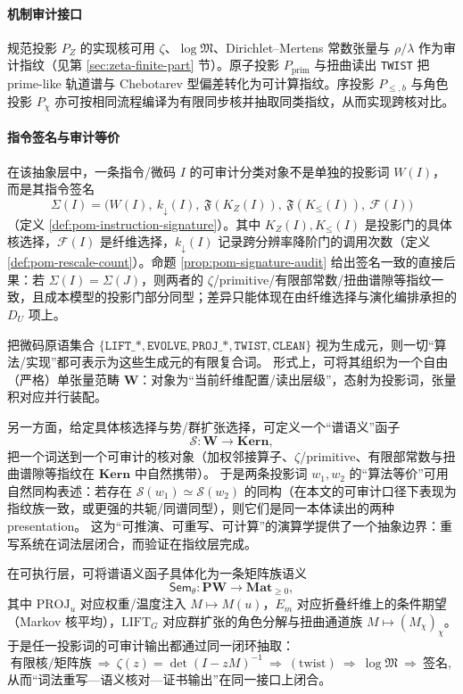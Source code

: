 \paragraph{机制审计接口}
规范投影 $P_Z$ 的实现核可用 $\zeta$、$\log\mathfrak{M}$、Dirichlet--Mertens 常数张量与 $\rho/\lambda$ 作为审计指纹（见第 \ref{sec:zeta-finite-part} 节）。原子投影 $P_{\mathrm{prim}}$ 与扭曲读出 \texttt{TWIST} 把 prime-like 轨道谱与 Chebotarev 型偏差转化为可计算指纹。序投影 $P_{\le,b}$ 与角色投影 $P_\chi$ 亦可按相同流程编译为有限同步核并抽取同类指纹，从而实现跨核对比。

\paragraph{指令签名与审计等价}
在该抽象层中，一条指令/微码 $I$ 的可审计分类对象不是单独的投影词 $W(I)$，而是其指令签名
$$
\Sigma(I)=\bigl(W(I),\ k_{\downarrow}(I),\ \mathfrak{F}(K_Z(I)),\ \mathfrak{F}(K_{\le}(I)),\ \mathcal{F}(I)\bigr)
$$
（定义 \ref{def:pom-instruction-signature}）。其中 $K_Z(I),K_{\le}(I)$ 是投影门的具体核选择，$\mathcal{F}(I)$ 是纤维选择，$k_{\downarrow}(I)$ 记录跨分辨率降阶门的调用次数（定义 \ref{def:pom-rescale-count}）。命题 \ref{prop:pom-signature-audit} 给出签名一致的直接后果：若 $\Sigma(I)=\Sigma(J)$，则两者的 $\zeta$/primitive/有限部常数/扭曲谱隙等指纹一致，且成本模型的投影门部分同型；差异只能体现在由纤维选择与演化编排承担的 $D_U$ 项上。

\begin{remark}[投影词范畴与“算法等价 = 自然同构”的口径]\label{rem:pom-word-category}
把微码原语集合
\(
\{\texttt{LIFT\_*},\texttt{EVOLVE},\texttt{PROJ\_*},\texttt{TWIST},\texttt{CLEAN}\}
\)
视为生成元，则一切“算法/实现”都可表示为这些生成元的有限复合词。
形式上，可将其组织为一个自由（严格）单张量范畴 \(\mathbf{W}\)：对象为“当前纤维配置/读出层级”，态射为投影词，张量积对应并行装配。

另一方面，给定具体核选择与势/群扩张选择，可定义一个“谱语义”函子
\[
\mathcal{S}:\mathbf{W}\to \mathbf{Kern},
\]
把一个词送到一个可审计的核对象（加权邻接算子、\(\zeta\)/primitive、有限部常数与扭曲谱隙等指纹在 \(\mathbf{Kern}\) 中自然携带）。
于是两条投影词 \(w_1,w_2\) 的“算法等价”可用自然同构表述：若存在 \(\mathcal{S}(w_1)\simeq \mathcal{S}(w_2)\) 的同构（在本文的可审计口径下表现为指纹族一致，或更强的共轭/同谱同型），则它们是同一本体读出的两种 presentation。
这为“可推演、可重写、可计算”的演算学提供了一个抽象边界：重写系统在词法层闭合，而验证在指纹层完成。
\end{remark}

\begin{remark}\label{rem:pom-sem-functor-loop}
在可执行层，可将谱语义函子具体化为一条矩阵族语义
\[
\mathsf{Sem}_\theta:\mathbf{PW}\to \mathbf{Mat}_{\ge 0},
\]
其中 \(\mathrm{PROJ}_u\) 对应权重/温度注入 \(M\mapsto M(u)\)，\(E_m\) 对应折叠纤维上的条件期望（Markov 核平均），\(\mathrm{LIFT}_G\) 对应群扩张的角色分解与扭曲通道族 \(M\mapsto (M_\chi)_\chi\)。
于是任一投影词的可审计输出都通过同一闭环抽取：
\[
\text{有限核/矩阵族}\ \Rightarrow\ \zeta(z)=\det(I-zM)^{-1}\ \Rightarrow\ (\text{twist})\ \Rightarrow\ \log\mathfrak{M}\ \Rightarrow\ \text{签名},
\]
从而“词法重写—语义核对—证书输出”在同一接口上闭合。
\end{remark}

